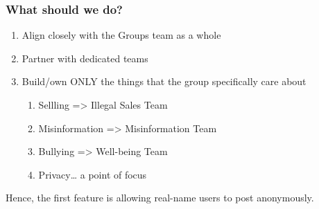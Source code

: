 \documentclass[letterpaper]{article}
\begin{document}
\subsubsection{What should we do?}
\label{sec:org67c3ee9}
\begin{enumerate}
\item Align closely with the Groups team as a whole
\item Partner with dedicated teams
\item Build/own ONLY the things that the group specifically care about
\begin{enumerate}
\item Sellling => Illegal Sales Team
\item Misinformation => Misinformation Team
\item Bullying => Well-being Team
\item Privacy\ldots{} a point of focus
\end{enumerate}
\end{enumerate}

Hence, the first feature is allowing real-name users to post anonymously.
\end{document}
